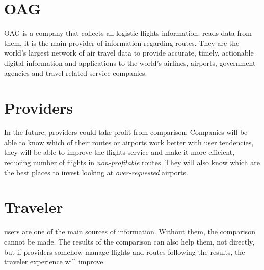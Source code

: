 \section{OAG} \label{sh_oag}

OAG is a company that collects all logistic flights information. \squad reads data from them, it is the main provider of information regarding routes. They are the world's largest network of air travel data to provide accurate, timely, actionable digital information and applications to the world's airlines, airports, government agencies and travel-related service companies\cite{oag}.

\section{Providers}

In the future, providers could take profit from \thesistitle comparison. Companies will be able to know which of their routes or airports work better with user tendencies, they will be able to improve the flights service and make it more efficient, reducing number of flights in \textit{non-profitable} routes. They will also know which are the best places to invest looking at \textit{over-requested} airports.

\section{Traveler}

\company users are one of the main sources of information. Without them, the comparison cannot be made. The results of the comparison can also help them, not directly, but if providers somehow manage flights and routes following the \thesistitle results, the traveler experience will improve.


